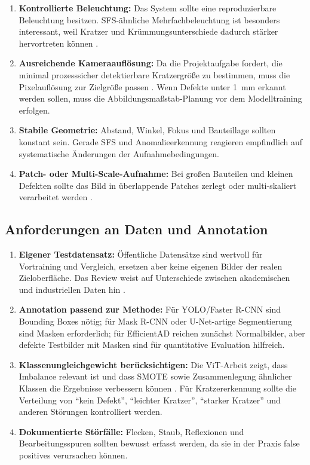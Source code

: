 \documentclass[11pt,a4paper]{article}
\begin{document}
\begin{enumerate}
    \item \textbf{Kontrollierte Beleuchtung:} Das System sollte eine reproduzierbare Beleuchtung besitzen. SFS-ähnliche Mehrfachbeleuchtung ist besonders interessant, weil Kratzer und Krümmungsunterschiede dadurch stärker hervortreten können \cite{ersteinfos}.
    \item \textbf{Ausreichende Kameraauflösung:} Da die Projektaufgabe fordert, die minimal prozesssicher detektierbare Kratzergröße zu bestimmen, muss die Pixelauflösung zur Zielgröße passen \cite{projektaufgabe}. Wenn Defekte unter \SI{1}{\milli\metre} erkannt werden sollen, muss die Abbildungsmaßstab-Planung vor dem Modelltraining erfolgen.
    \item \textbf{Stabile Geometrie:} Abstand, Winkel, Fokus und Bauteillage sollten konstant sein. Gerade SFS und Anomalieerkennung reagieren empfindlich auf systematische Änderungen der Aufnahmebedingungen.
    \item \textbf{Patch- oder Multi-Scale-Aufnahme:} Bei großen Bauteilen und kleinen Defekten sollte das Bild in überlappende Patches zerlegt oder multi-skaliert verarbeitet werden \cite{ersteinfos,applications_review}.
\end{enumerate}

\subsection{Anforderungen an Daten und Annotation}

\begin{enumerate}
    \item \textbf{Eigener Testdatensatz:} Öffentliche Datensätze sind wertvoll für Vortraining und Vergleich, ersetzen aber keine eigenen Bilder der realen Zieloberfläche. Das Review weist auf Unterschiede zwischen akademischen und industriellen Daten hin \cite{applications_review}.
    \item \textbf{Annotation passend zur Methode:} Für YOLO/Faster R-CNN sind Bounding Boxes nötig; für Mask R-CNN oder U-Net-artige Segmentierung sind Masken erforderlich; für EfficientAD reichen zunächst Normalbilder, aber defekte Testbilder mit Masken sind für quantitative Evaluation hilfreich.
    \item \textbf{Klassenungleichgewicht berücksichtigen:} Die ViT-Arbeit zeigt, dass Imbalance relevant ist und dass SMOTE sowie Zusammenlegung ähnlicher Klassen die Ergebnisse verbessern können \cite{vit_thesis}. Für Kratzererkennung sollte die Verteilung von \enquote{kein Defekt}, \enquote{leichter Kratzer}, \enquote{starker Kratzer} und anderen Störungen kontrolliert werden.
    \item \textbf{Dokumentierte Störfälle:} Flecken, Staub, Reflexionen und Bearbeitungsspuren sollten bewusst erfasst werden, da sie in der Praxis false positives verursachen können.
\end{enumerate}
\end{document}
